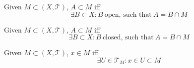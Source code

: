 \begin{definition}
   Given \(M \subset (X, \mathcal{T})\), \(A \subset M\) iff
   \[\exists B \subset X: B~\text{open, such that}~A = B \cap M\]
\end{definition}

\begin{definition}
   Given \(M \subset (X, \mathcal{T})\), \(A \subset M\) iff
   \[\exists B \subset X: B~\text{closed, such that}~A = B \cap M\]
\end{definition}

\begin{definition}
   Given \(M \subset (X, \mathcal{T})\), \(x \in M\) iff
   \[\exists U \in \mathcal{T}_M: x \in U \subset M\]
\end{definition}
